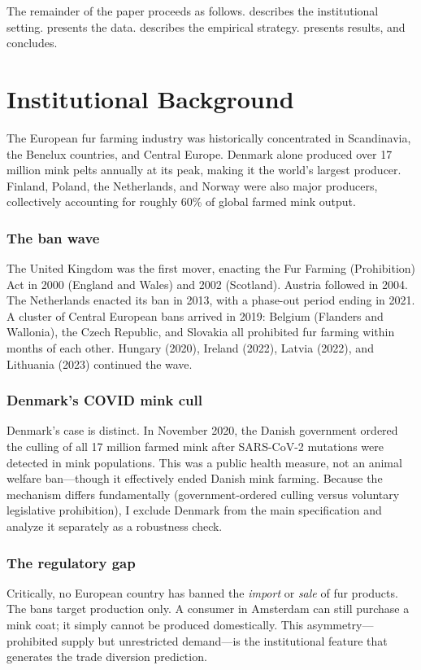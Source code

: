 \documentclass[12pt]{article}
\begin{document}
The remainder of the paper proceeds as follows.  describes the institutional setting.  presents the data.  describes the empirical strategy.  presents results, and  concludes.


\section{Institutional Background}\label{sec:background}

The European fur farming industry was historically concentrated in Scandinavia, the Benelux countries, and Central Europe. Denmark alone produced over 17 million mink pelts annually at its peak, making it the world's largest producer. Finland, Poland, the Netherlands, and Norway were also major producers, collectively accounting for roughly 60\% of global farmed mink output.

\subsubsection*{The ban wave} The United Kingdom was the first mover, enacting the Fur Farming (Prohibition) Act in 2000 (England and Wales) and 2002 (Scotland). Austria followed in 2004. The Netherlands enacted its ban in 2013, with a phase-out period ending in 2021. A cluster of Central European bans arrived in 2019: Belgium (Flanders and Wallonia), the Czech Republic, and Slovakia all prohibited fur farming within months of each other. Hungary (2020), Ireland (2022), Latvia (2022), and Lithuania (2023) continued the wave.

\subsubsection*{Denmark's COVID mink cull} Denmark's case is distinct. In November 2020, the Danish government ordered the culling of all 17 million farmed mink after SARS-CoV-2 mutations were detected in mink populations. This was a public health measure, not an animal welfare ban---though it effectively ended Danish mink farming. Because the mechanism differs fundamentally (government-ordered culling versus voluntary legislative prohibition), I exclude Denmark from the main specification and analyze it separately as a robustness check.

\subsubsection*{The regulatory gap} Critically, no European country has banned the \textit{import} or \textit{sale} of fur products. The bans target production only. A consumer in Amsterdam can still purchase a mink coat; it simply cannot be produced domestically. This asymmetry---prohibited supply but unrestricted demand---is the institutional feature that generates the trade diversion prediction.
\end{document}
